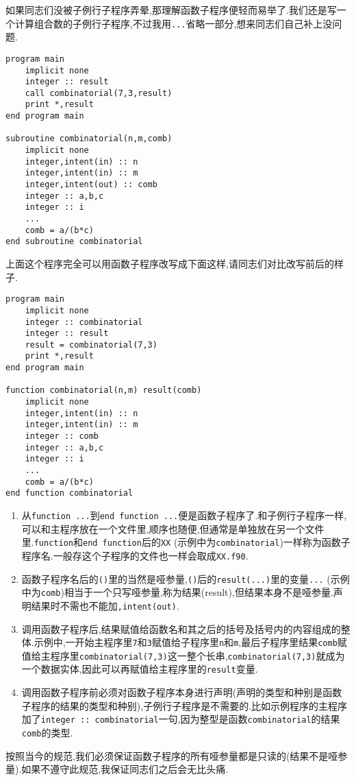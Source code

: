 如果同志们没被子例行子程序弄晕,那理解函数子程序便轻而易举了.我们还是写一个计算组合数的子例行子程序,不过我用\texttt{...}省略一部分,想来同志们自己补上没问题.
\begin{lstlisting}
program main
    implicit none
    integer :: result
    call combinatorial(7,3,result)
    print *,result
end program main

subroutine combinatorial(n,m,comb)
    implicit none
    integer,intent(in) :: n
    integer,intent(in) :: m
    integer,intent(out) :: comb
    integer :: a,b,c
    integer :: i
    ...
    comb = a/(b*c)
end subroutine combinatorial
\end{lstlisting}
上面这个程序完全可以用函数子程序改写成下面这样,请同志们对比改写前后的样子.
\begin{lstlisting}
program main
    implicit none
    integer :: combinatorial
    integer :: result
    result = combinatorial(7,3)
    print *,result
end program main

function combinatorial(n,m) result(comb)
    implicit none
    integer,intent(in) :: n
    integer,intent(in) :: m
    integer :: comb
    integer :: a,b,c
    integer :: i
    ...
    comb = a/(b*c)
end function combinatorial
\end{lstlisting}
\begin{enumerate}
    \item 从\texttt{function ...}到\texttt{end function ...}便是函数子程序了.和子例行子程序一样,可以和主程序放在一个文件里,顺序也随便,但通常是单独放在另一个文件里.\texttt{function}和\texttt{end function}后的\texttt{XX} (示例中为\texttt{combinatorial})一样称为函数子程序名.一般存这个子程序的文件也一样会取成\texttt{XX.f90}.
    \item 函数子程序名后的\texttt{()}里的当然是哑参量,\texttt{()}后的\texttt{result(...)}里的变量\texttt{...} (示例中为\texttt{comb})相当于一个只写哑参量,称为结果(result),但结果本身不是哑参量.声明结果时不需也不能加\texttt{,intent(out)}.
    \item 调用函数子程序后,结果赋值给函数名和其之后的括号及括号内的内容组成的整体.示例中,一开始主程序里\texttt{7}和\texttt{3}赋值给子程序里\texttt{n}和\texttt{m},最后子程序里结果\texttt{comb}赋值给主程序里\texttt{combinatorial(7,3)}这一整个长串,\texttt{combinatorial(7,3)}就成为一个数据实体,因此可以再赋值给主程序里的\texttt{result}变量.
    \item 调用函数子程序前必须对函数子程序本身进行声明(声明的类型和种别是函数子程序的结果的类型和种别),子例行子程序是不需要的.比如示例程序的主程序加了\texttt{integer :: combinatorial}一句,因为整型是函数\texttt{combinatorial}的结果\texttt{comb}的类型.
\end{enumerate}
按照当今的规范,我们必须保证函数子程序的所有哑参量都是只读的(结果不是哑参量).如果不遵守此规范,我保证同志们之后会无比头痛.

